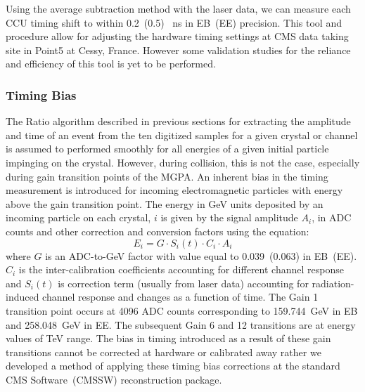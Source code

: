 Using the average subtraction method with the laser data, we can measure each CCU timing shift to within 0.2~(0.5)~ ns in EB~(EE) precision. This tool and procedure allow for adjusting the hardware timing settings at CMS data taking site in Point5 at Cessy, France. However some validation studies for the reliance and efficiency of this tool is yet to be performed.  

\subsubsection{Timing Bias}
The  Ratio algorithm described in previous sections for extracting the amplitude and time of an event from the ten digitized samples for a given crystal or channel is assumed to performed smoothly for all energies of a given initial particle impinging on the crystal. However, during collision, this is not the case, especially during gain transition points of the MGPA. An inherent bias in the timing measurement is introduced for incoming electromagnetic particles with energy above the gain transition point. The energy in GeV units deposited by an incoming particle on each crystal, $i$ is given by the signal amplitude $A_{i}$, in ADC counts and other correction and conversion factors using the equation:
\begin{equation}
    E_{i} =  G \cdot S_{i}(t) \cdot C_{i} \cdot A_{i} 
\end{equation}
where $G$ is an ADC-to-GeV factor with value equal to 0.039~(0.063) in EB~(EE). $C_{i}$ is the inter-calibration coefficients accounting for different channel response and $S_{i}(t)$ is correction term (usually from laser data) accounting for radiation-induced channel response  and changes as a function of time. The Gain 1 transition point occurs at 4096 ADC counts corresponding to 159.744~GeV in EB and 258.048~GeV in EE. The subsequent Gain 6 and 12 transitions are at energy values of TeV range.
The bias in timing introduced as a result of these gain transitions cannot be corrected at hardware  or calibrated away rather we developed a method of applying these timing bias corrections at the standard CMS Software~(CMSSW) reconstruction package.
